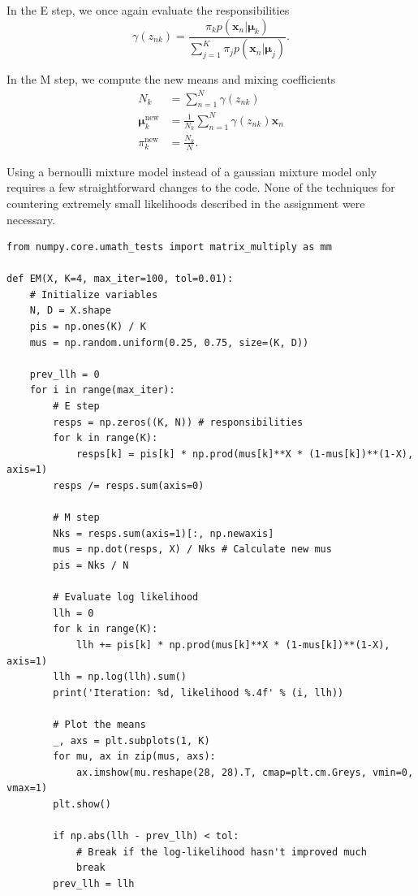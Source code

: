 \documentclass[a4paper]{article}
\begin{document}
\begin{enumerate}
In the E step, we once again evaluate the responsibilities
\begin{equation}
\gamma(z_{nk}) = \frac{\pi_kp(\bm{x}_n|\bm{\mu}_k)}{\sum_{j=1}^K\pi_jp(\bm{x}_n|\bm{\mu}_j)}.
\end{equation}

In the M step, we compute the new means and mixing coefficients
\begin{align}
N_k &= \sum_{n=1}^N\gamma(z_{nk}) \\
\bm{\mu}_k^{\text{new}} &=\frac{1}{N_k}\sum_{n=1}^N\gamma(z_{nk})\bm{x}_n \\
\pi_k^{\text{new}} &= \frac{N_k}{N}.
\end{align}

Using a bernoulli mixture model instead of a gaussian mixture model only requires a few straightforward changes to the code. None of the techniques for countering extremely small likelihoods described in the assignment were necessary.

\begin{lstlisting}
from numpy.core.umath_tests import matrix_multiply as mm

def EM(X, K=4, max_iter=100, tol=0.01):
    # Initialize variables
    N, D = X.shape
    pis = np.ones(K) / K
    mus = np.random.uniform(0.25, 0.75, size=(K, D))
    
    prev_llh = 0
    for i in range(max_iter):
        # E step
        resps = np.zeros((K, N)) # responsibilities
        for k in range(K):
            resps[k] = pis[k] * np.prod(mus[k]**X * (1-mus[k])**(1-X), axis=1)
        resps /= resps.sum(axis=0)
        
        # M step
        Nks = resps.sum(axis=1)[:, np.newaxis]
        mus = np.dot(resps, X) / Nks # Calculate new mus
        pis = Nks / N
        
        # Evaluate log likelihood
        llh = 0
        for k in range(K):
            llh += pis[k] * np.prod(mus[k]**X * (1-mus[k])**(1-X), axis=1)
        llh = np.log(llh).sum()
        print('Iteration: %d, likelihood %.4f' % (i, llh))
        
        # Plot the means
        _, axs = plt.subplots(1, K)
        for mu, ax in zip(mus, axs):
            ax.imshow(mu.reshape(28, 28).T, cmap=plt.cm.Greys, vmin=0, vmax=1)
        plt.show()

        if np.abs(llh - prev_llh) < tol:
            # Break if the log-likelihood hasn't improved much
            break
        prev_llh = llh
    

\end{lstlisting}
\end{enumerate}
\end{document}

